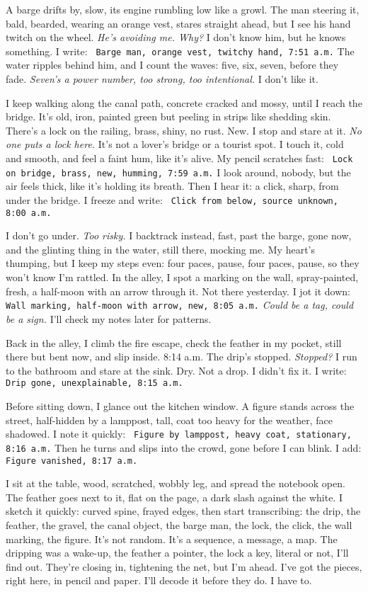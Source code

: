 \documentclass[12pt]{article}
\newcommand{\note}[1]{\texttt{\small \color{DarkGray} #1}}
\begin{document}
A barge drifts by, slow, its engine rumbling low like a growl. The man steering it, bald, bearded, wearing an orange vest, stares straight ahead, but I see his hand twitch on the wheel. \textit{He’s avoiding me. Why?} I don’t know him, but he knows something. I write: \note{Barge man, orange vest, twitchy hand, 7:51 a.m.} The water ripples behind him, and I count the waves: five, six, seven, before they fade. \textit{Seven’s a power number, too strong, too intentional.} I don’t like it.

I keep walking along the canal path, concrete cracked and mossy, until I reach the bridge. It’s old, iron, painted green but peeling in strips like shedding skin. There’s a lock on the railing, brass, shiny, no rust. New. I stop and stare at it. \textit{No one puts a lock here.} It’s not a lover’s bridge or a tourist spot. I touch it, cold and smooth, and feel a faint hum, like it’s alive. My pencil scratches fast: \note{Lock on bridge, brass, new, humming, 7:59 a.m.} I look around, nobody, but the air feels thick, like it’s holding its breath. Then I hear it: a click, sharp, from under the bridge. I freeze and write: \note{Click from below, source unknown, 8:00 a.m.}

I don’t go under. \textit{Too risky.} I backtrack instead, fast, past the barge, gone now, and the glinting thing in the water, still there, mocking me. My heart’s thumping, but I keep my steps even: four paces, pause, four paces, pause, so they won’t know I’m rattled. In the alley, I spot a marking on the wall, spray-painted, fresh, a half-moon with an arrow through it. Not there yesterday. I jot it down: \note{Wall marking, half-moon with arrow, new, 8:05 a.m.} \textit{Could be a tag, could be a sign.} I’ll check my notes later for patterns.

Back in the alley, I climb the fire escape, check the feather in my pocket, still there but bent now, and slip inside. 8:14 a.m. The drip’s stopped. \textit{Stopped?} I run to the bathroom and stare at the sink. Dry. Not a drop. I didn’t fix it. I write: \note{Drip gone, unexplainable, 8:15 a.m.}

Before sitting down, I glance out the kitchen window. A figure stands across the street, half-hidden by a lamppost, tall, coat too heavy for the weather, face shadowed. I note it quickly: \note{Figure by lamppost, heavy coat, stationary, 8:16 a.m.} Then he turns and slips into the crowd, gone before I can blink. I add: \note{Figure vanished, 8:17 a.m.}

I sit at the table, wood, scratched, wobbly leg, and spread the notebook open. The feather goes next to it, flat on the page, a dark slash against the white. I sketch it quickly: curved spine, frayed edges, then start transcribing: the drip, the feather, the gravel, the canal object, the barge man, the lock, the click, the wall marking, the figure. It’s not random. It’s a sequence, a message, a map. The dripping was a wake-up, the feather a pointer, the lock a key, literal or not, I’ll find out. They’re closing in, tightening the net, but I’m ahead. I’ve got the pieces, right here, in pencil and paper. I’ll decode it before they do. I have to.
\end{document}
